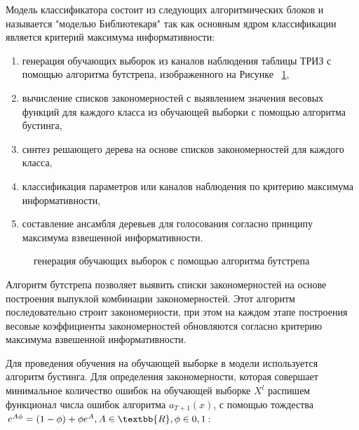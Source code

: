 Модель классификатора состоит из следующих алгоритмических блоков и называется "моделью Библиотекаря" так как основным ядром классификации является критерий максимума информативности:

\begin{enumerate}
	\item генерация обучающих выборок из каналов наблюдения таблицы ТРИЗ с помощью алгоритма бутстрепа, изображенного на Рисунке ~\cref{fig:bootstrap},
	\item вычисление списков закономерностей с выявлением значения весовых функций для каждого класса из обучающей выборки с помощью алгоритма бустинга,
	\item синтез решающего дерева на основе списков закономерностей для каждого класса,
	\item классификация параметров или каналов наблюдения по критерию максимума информативности,
	\item составление ансамбля деревьев для голосования согласно принципу максимума взвешенной информативности.
\end{enumerate}


\begin{figure}[ht]
    \caption{генерация обучающих выборок с помощью алгоритма бутстрепа}\label{fig:bootstrap}
\end{figure}

Алгоритм бутстрепа позволяет выявить списки закономерностей на основе построения выпуклой комбинации закономерностей. Этот алгоритм последовательно строит закономерности, при этом на каждом этапе построения весовые коэффициенты закономерностей обновляются согласно критерию максимума взвешенной информативности. 

Для проведения обучения на обучающей выборке в модели используется алгоритм бустинга. Для определения закономерности, которая совершает минимальное количество ошибок на обучающей выборке $X^{l}$  распишем функционал числа ошибок алгоритма $a_{T+1}(x)$, с помощью тождества 
$e^{A\phi} = (1-\phi)+\phi e^{A}, A \in \textbb{R}, \phi \in {0,1} $:

